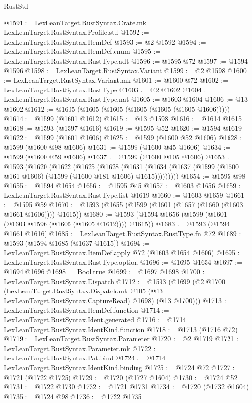 \begin{lexlean}{RustStd}
\begin{coremodule}
@1591 := LexLeanTarget.RustSyntax.Crate.mk LexLeanTarget.RustSyntax.Profile.std
@1592 := LexLeanTarget.RustSyntax.ItemDef
@1593 := @2 @1592
@1594 := LexLeanTarget.RustSyntax.ItemDef.enum
@1595 := LexLeanTarget.RustSyntax.RustType.adt
@1596 := @1595 @72
@1597 := @1594 @1596
@1598 := LexLeanTarget.RustSyntax.Variant
@1599 := @2 @1598
@1600 := LexLeanTarget.RustSyntax.Variant.mk
@1601 := @1600 @72
@1602 := LexLeanTarget.RustSyntax.RustType
@1603 := @2 @1602
@1604 := LexLeanTarget.RustSyntax.RustType.nat
@1605 := @1603 @1604
@1606 := @13 @1602
@1612 := @1605 (@1605 (@1605 (@1605 (@1605 (@1605 @1606)))))
@1614 := @1599 (@1601 @1612)
@1615 := @13 @1598
@1616 := @1614 @1615
@1618 := @1593 (@1597 @1616)
@1619 := @1595 @52
@1620 := @1594 @1619
@1622 := @1599 (@1601 @1606)
@1625 := @1599 (@1600 @52 @1606)
@1628 := @1599 (@1600 @98 @1606)
@1631 := @1599 (@1600 @45 @1606)
@1634 := @1599 (@1600 @59 @1606)
@1637 := @1599 (@1600 @105 @1606)
@1653 := @1593
    (@1620
      (@1622
        (@1625
          (@1628
            (@1631 (@1634 (@1637 (@1599 (@1600 @161 @1606) (@1599 (@1600 @181 @1606) @1615)))))))))
@1654 := @1595 @98
@1655 := @1594 @1654
@1656 := @1595 @45
@1657 := @1603 @1656
@1659 := LexLeanTarget.RustSyntax.RustType.list @1619
@1660 := @1603 @1659
@1661 := @1595 @59
@1670 := @1593 (@1655 (@1599 (@1601 (@1657 (@1660 (@1603 @1661 @1606)))) @1615))
@1680 := @1593 (@1594 @1656 (@1599 (@1601 (@1603 @1596 (@1605 (@1605 @1612)))) @1615))
@1683 := @1593 (@1594 @1661 @1616)
@1685 := LexLeanTarget.RustSyntax.RustType.fn @72
@1689 := @1593 (@1594 @1685 (@1637 @1615))
@1694 := LexLeanTarget.RustSyntax.ItemDef.apply @72 (@1603 @1654 @1606)
@1695 := LexLeanTarget.RustSyntax.RustType.option
@1696 := @1695 @1654
@1697 := @1694 @1696
@1698 := Bool.true
@1699 := @1697 @1698
@1700 := LexLeanTarget.RustSyntax.Dispatch
@1712 := @1593
    (@1699
      (@2
        @1700
        (LexLeanTarget.RustSyntax.Dispatch.mk @105 (@13 LexLeanTarget.RustSyntax.CaptureRead) @1698)
        (@13 @1700)))
@1713 := LexLeanTarget.RustSyntax.ItemDef.function
@1714 := LexLeanTarget.RustSyntax.Ident.generated
@1716 := @1714 LexLeanTarget.RustSyntax.IdentKind.function
@1718 := @1713 (@1716 @72)
@1719 := LexLeanTarget.RustSyntax.Parameter
@1720 := @2 @1719
@1721 := LexLeanTarget.RustSyntax.Parameter.mk
@1722 := LexLeanTarget.RustSyntax.Pat.bind
@1724 := @1714 LexLeanTarget.RustSyntax.IdentKind.binding
@1725 := @1724 @72
@1727 := @1721 (@1722 @1725)
@1729 := @1720 (@1727 @1604)
@1730 := @1724 @52
@1731 := @1722 @1730
@1732 := @1721 @1731
@1734 := @1720 (@1732 @1604)
@1735 := @1724 @98
@1736 := @1722 @1735

\end{coremodule}
\end{lexlean}
